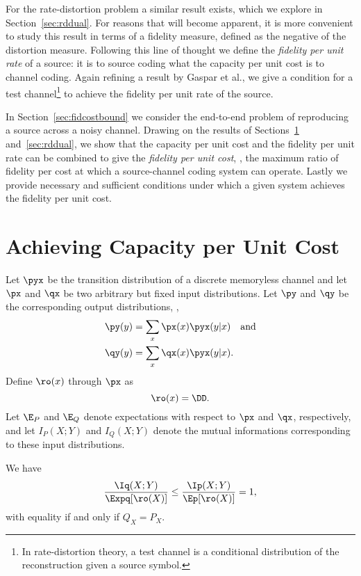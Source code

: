 For the rate-distortion problem a similar result exists, which we explore in
Section~\ref{sec:rddual}. For reasons that will become apparent, it is more
convenient to study this result in terms of a fidelity measure, defined as the
negative of the distortion measure. Following this line of
thought we define the \emph{fidelity per unit rate} of a source:
it is to source coding what the capacity per unit cost is to channel coding.
Again refining a result by Gaspar et al., we give a condition for a test
channel\footnote{In rate-distortion theory, a test channel is a conditional
distribution of the reconstruction given a source symbol.}
to achieve the fidelity per unit rate of the source. 

In Section~\ref{sec:fidcostbound} we consider the end-to-end problem of
reproducing a source across a noisy channel. Drawing on the results of
Sections~\ref{sec:cuc} and~\ref{sec:rddual}, we show that the capacity per unit
cost and the fidelity per unit rate can be combined to give the \emph{fidelity
per unit cost}, \ie, the maximum ratio of fidelity per cost at which a
source-channel coding system can operate. Lastly we provide necessary and
sufficient conditions under which a given system achieves the fidelity per unit
cost.


\section{Achieving Capacity per Unit Cost}
\label{sec:cuc}

Let $\pyx$ be the transition distribution of a discrete memoryless channel and
let $\px$ and $\qx$ be two arbitrary but fixed input distributions. Let $\py$
and $\qy$ be the corresponding output distributions, \ie, 
\begin{align*}
  \py(y) &= \sum_x \px(x) \pyx(y|x) \quad\text{and} \\
  \qy(y) &= \sum_x \qx(x) \pyx(y|x).
\end{align*}
Define $\ro(x)$ through $\px$ as
\begin{equation}
  \label{eq:optrho}
  \ro(x) = \DD.
\end{equation}
Let $\E_P$ and $\E_Q$ denote expectations with respect to $\px$ and $\qx$,
respectively, and let $I_P(X;Y)$ and $I_Q(X;Y)$ denote the mutual informations
corresponding to these input distributions. 

\begin{proposition}
  \label{prop:ratepercost}
  We have
  \begin{equation}
    \label{eq:ratepercost}
    \frac{\Iq(X;Y)}{\Expq[\ro(X)]} \le \frac{\Ip(X;Y)}{\Ep[\ro(X)]} = 1,
  \end{equation}
  with equality if and only if $Q_X = P_X$.
\end{proposition}

